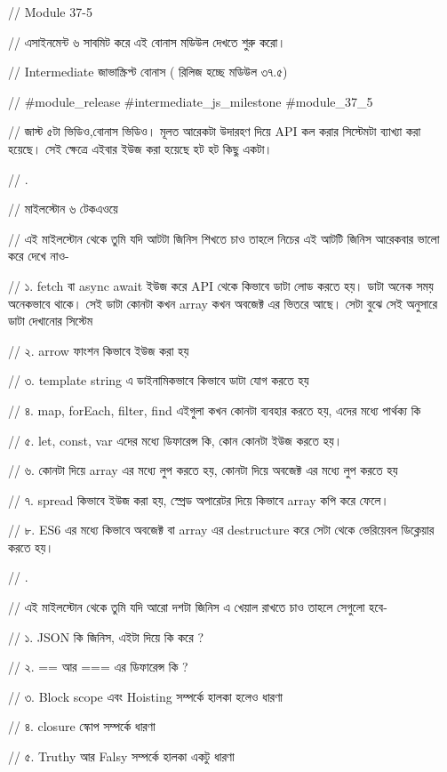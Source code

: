 // Module 37-5



// এসাইনমেন্ট ৬ সাবমিট করে এই বোনাস মডিউল দেখতে শুরু করো। 

// Intermediate জাভাস্ক্রিপ্ট বোনাস ( রিলিজ হচ্ছে মডিউল ৩৭.৫)

// #module_release #intermediate_js_milestone #module_37_5

// জাস্ট ৫টা ভিডিও,বোনাস ভিডিও। মূলত আরেকটা উদারহণ দিয়ে API কল করার সিস্টেমটা ব্যাখ্যা করা হয়েছে। সেই ক্ষেত্রে এইবার ইউজ করা হয়েছে হট হট কিছু একটা। 



// .

// মাইলস্টোন ৬ টেকএওয়ে  

// এই মাইলস্টোন থেকে তুমি যদি আটটা জিনিস শিখতে চাও তাহলে নিচের এই আটটি জিনিস আরেকবার ভালো করে দেখে নাও- 

// ১. fetch বা async await ইউজ করে API থেকে কিভাবে ডাটা লোড করতে হয়। ডাটা অনেক সময় অনেকভাবে থাকে। সেই ডাটা কোনটা কখন array কখন অবজেক্ট এর ভিতরে আছে। সেটা বুঝে সেই অনুসারে ডাটা দেখানোর সিস্টেম 

// ২. arrow ফাংশন কিভাবে ইউজ করা হয়

// ৩. template string এ ডাইনামিকভাবে কিভাবে ডাটা যোগ করতে হয় 

// ৪. map, forEach, filter, find এইগুলা কখন কোনটা ব্যবহার করতে হয়, এদের মধ্যে পার্থক্য কি 

// ৫. let, const, var এদের মধ্যে ডিফারেন্স কি, কোন কোনটা ইউজ করতে হয়। 

// ৬. কোনটা দিয়ে array এর মধ্যে লুপ করতে হয়, কোনটা দিয়ে অবজেক্ট এর মধ্যে লুপ করতে হয়  

// ৭. spread কিভাবে ইউজ করা হয়, স্প্রেড অপারেটর দিয়ে কিভাবে array কপি করে ফেলে।  

// ৮. ES6 এর মধ্যে কিভাবে অবজেক্ট বা array এর destructure করে সেটা থেকে ভেরিয়েবল ডিক্লেয়ার করতে হয়। 



// .



// এই মাইলস্টোন থেকে তুমি যদি আরো দশটা জিনিস এ খেয়াল রাখতে চাও তাহলে সেগুলো হবে- 

// ১. JSON কি জিনিস, এইটা দিয়ে কি করে ?

// ২. == আর === এর ডিফারেন্স কি ? 

// ৩. Block scope এবং Hoisting সম্পর্কে হালকা হলেও ধারণা 

// ৪. closure স্কোপ সম্পর্কে ধারণা 

// ৫. Truthy আর Falsy সম্পর্কে হালকা একটু ধারণা 

